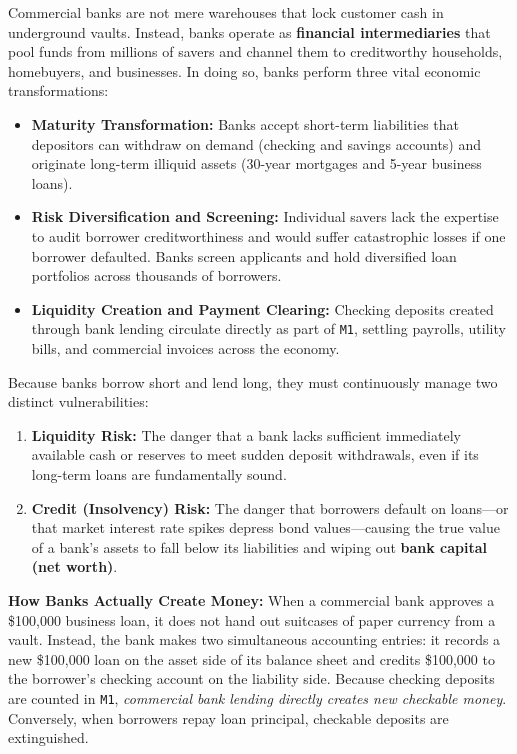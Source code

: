 \documentclass[11pt, oneside]{book}
\begin{document}
Commercial banks are not mere warehouses that lock customer cash in underground vaults. Instead, banks operate as \textbf{financial intermediaries} that pool funds from millions of savers and channel them to creditworthy households, homebuyers, and businesses. In doing so, banks perform three vital economic transformations:
\begin{itemize}[leftmargin=1.5em, itemsep=3pt]
  \item \textbf{Maturity Transformation:} Banks accept short-term liabilities that depositors can withdraw on demand (checking and savings accounts) and originate long-term illiquid assets (30-year mortgages and 5-year business loans).
  \item \textbf{Risk Diversification and Screening:} Individual savers lack the expertise to audit borrower creditworthiness and would suffer catastrophic losses if one borrower defaulted. Banks screen applicants and hold diversified loan portfolios across thousands of borrowers.
  \item \textbf{Liquidity Creation and Payment Clearing:} Checking deposits created through bank lending circulate directly as part of \texttt{M1}, settling payrolls, utility bills, and commercial invoices across the economy.
\end{itemize}

Because banks borrow short and lend long, they must continuously manage two distinct vulnerabilities:
\begin{enumerate}[leftmargin=1.5em, itemsep=3pt]
  \item \textbf{Liquidity Risk:} The danger that a bank lacks sufficient immediately available cash or reserves to meet sudden deposit withdrawals, even if its long-term loans are fundamentally sound.
  \item \textbf{Credit (Insolvency) Risk:} The danger that borrowers default on loans—or that market interest rate spikes depress bond values—causing the true value of a bank's assets to fall below its liabilities and wiping out \textbf{bank capital (net worth)}.
\end{enumerate}

\textbf{How Banks Actually Create Money:} When a commercial bank approves a \$100,000 business loan, it does not hand out suitcases of paper currency from a vault. Instead, the bank makes two simultaneous accounting entries: it records a new \$100,000 loan on the asset side of its balance sheet and credits \$100,000 to the borrower's checking account on the liability side. Because checking deposits are counted in \texttt{M1}, \emph{commercial bank lending directly creates new checkable money}. Conversely, when borrowers repay loan principal, checkable deposits are extinguished.
\end{document}
